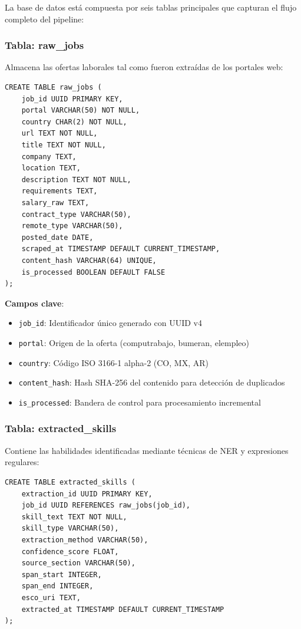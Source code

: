 La base de datos está compuesta por seis tablas principales que capturan el flujo completo del pipeline:

\subsubsection{Tabla: raw\_jobs}

Almacena las ofertas laborales tal como fueron extraídas de los portales web:

\begin{verbatim}
CREATE TABLE raw_jobs (
    job_id UUID PRIMARY KEY,
    portal VARCHAR(50) NOT NULL,
    country CHAR(2) NOT NULL,
    url TEXT NOT NULL,
    title TEXT NOT NULL,
    company TEXT,
    location TEXT,
    description TEXT NOT NULL,
    requirements TEXT,
    salary_raw TEXT,
    contract_type VARCHAR(50),
    remote_type VARCHAR(50),
    posted_date DATE,
    scraped_at TIMESTAMP DEFAULT CURRENT_TIMESTAMP,
    content_hash VARCHAR(64) UNIQUE,
    is_processed BOOLEAN DEFAULT FALSE
);
\end{verbatim}

\textbf{Campos clave}:
\begin{itemize}
    \item \texttt{job\_id}: Identificador único generado con UUID v4
    \item \texttt{portal}: Origen de la oferta (computrabajo, bumeran, elempleo)
    \item \texttt{country}: Código ISO 3166-1 alpha-2 (CO, MX, AR)
    \item \texttt{content\_hash}: Hash SHA-256 del contenido para detección de duplicados
    \item \texttt{is\_processed}: Bandera de control para procesamiento incremental
\end{itemize}

\subsubsection{Tabla: extracted\_skills}

Contiene las habilidades identificadas mediante técnicas de NER y expresiones regulares:

\begin{verbatim}
CREATE TABLE extracted_skills (
    extraction_id UUID PRIMARY KEY,
    job_id UUID REFERENCES raw_jobs(job_id),
    skill_text TEXT NOT NULL,
    skill_type VARCHAR(50),
    extraction_method VARCHAR(50),
    confidence_score FLOAT,
    source_section VARCHAR(50),
    span_start INTEGER,
    span_end INTEGER,
    esco_uri TEXT,
    extracted_at TIMESTAMP DEFAULT CURRENT_TIMESTAMP
);
\end{verbatim}

